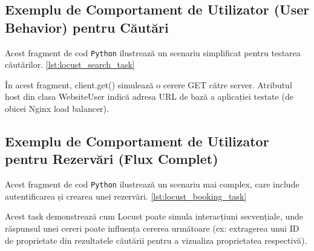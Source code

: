 \documentclass[12pt, a4paper, oneside, romanian]{teza-upb}
\begin{document}
\subsection{Exemplu de Comportament de Utilizator (User Behavior) pentru Căutări}
Acest fragment de cod \texttt{Python} ilustrează un scenariu simplificat pentru testarea căutărilor. \ref{lst:locust_search_task}

În acest fragment, client.get() simulează o cerere GET către server. Atributul host din clasa WebsiteUser indică adresa URL de bază a aplicației testate (de obicei Nginx load balancer).

\subsection{Exemplu de Comportament de Utilizator pentru Rezervări (Flux Complet)}
Acest fragment de cod \texttt{Python} ilustrează un scenariu mai complex, care include autentificarea și crearea unei rezervări. \ref{lst:locust_booking_task}

Acest task demonstrează cum Locust poate simula interacțiuni secvențiale, unde răspunsul unei cereri poate influența cererea următoare (ex: extragerea unui ID de proprietate din rezultatele căutării pentru a vizualiza proprietatea respectivă).
\end{document}
